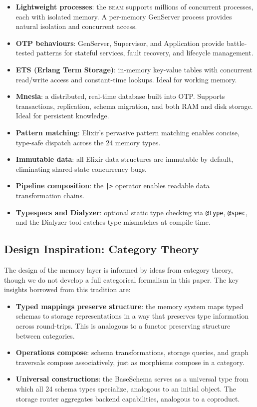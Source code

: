 \documentclass[12pt,a4paper]{article}
\theoremstyle{definition}
\newcommand{\BEAM}{\textsc{beam}}
\begin{document}
\begin{itemize}
  \item \textbf{Lightweight processes}: the \BEAM{} supports millions of concurrent processes, each with isolated memory.
  A per-memory GenServer process provides natural isolation and concurrent access.
  \item \textbf{OTP behaviours}: GenServer, Supervisor, and Application provide battle-tested patterns for stateful services, fault recovery, and lifecycle management.
  \item \textbf{ETS (Erlang Term Storage)}: in-memory key-value tables with concurrent read/write access and constant-time lookups.
  Ideal for working memory.
  \item \textbf{Mnesia}: a distributed, real-time database built into OTP.
  Supports transactions, replication, schema migration, and both RAM and disk storage.
  Ideal for persistent knowledge.
  \item \textbf{Pattern matching}: Elixir's pervasive pattern matching enables concise, type-safe dispatch across the 24 memory types.
  \item \textbf{Immutable data}: all Elixir data structures are immutable by default, eliminating shared-state concurrency bugs.
  \item \textbf{Pipeline composition}: the \texttt{|>} operator enables readable data transformation chains.
  \item \textbf{Typespecs and Dialyzer}: optional static type checking via \texttt{@type}, \texttt{@spec}, and the Dialyzer tool catches type mismatches at compile time.
\end{itemize}

\subsection{Design Inspiration: Category Theory}\label{subsec:cattheory-background}

The design of the memory layer is informed by ideas from category theory, though we do not develop a full categorical formalism in this paper.
The key insights borrowed from this tradition are:

\begin{itemize}
  \item \textbf{Typed mappings preserve structure}: the memory system maps typed schemas to storage representations in a way that preserves type information across round-trips.
  This is analogous to a functor preserving structure between categories.
  \item \textbf{Operations compose}: schema transformations, storage queries, and graph traversals compose associatively, just as morphisms compose in a category.
  \item \textbf{Universal constructions}: the BaseSchema serves as a universal type from which all 24 schema types specialize, analogous to an initial object.
  The storage router aggregates backend capabilities, analogous to a coproduct.
\end{itemize}
\end{document}
